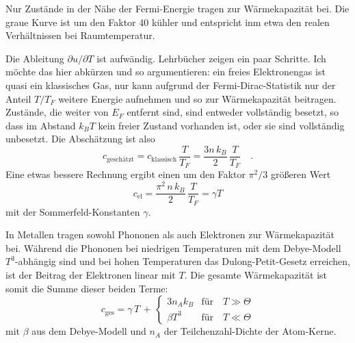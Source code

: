 \begin{marginfigure}
    \caption{Nur Zustände in der Nähe der Fermi-Energie tragen zur Wärmekapazität bei. Die graue Kurve ist um den Faktor 40 kühler und entspricht inm etwa den realen Verhältnissen bei Raumtemperatur.}
    \label{fig:2_fermi_dirac_T}
\end{marginfigure}


Die Ableitung $\partial u / \partial T$ ist aufwändig. Lehrbücher zeigen ein paar Schritte. Ich möchte das hier abkürzen und so argumentieren: ein freies Elektronengas ist quasi ein klassisches Gas, nur kann aufgrund der Fermi-Dirac-Statistik nur der Anteil $T/T_F$ weitere Energie aufnehmen und so zur Wärmekapazität beitragen. Zustände, die weiter von $E_F$ entfernt sind, sind entweder vollständig besetzt, so dass im Abstand $k_B T$ kein freier Zustand vorhanden ist, oder sie sind vollständig unbesetzt. Die Abschätzung ist also
\begin{equation}
    c_\text{geschätzt} = c_\text{klassisch}  \, \frac{T}{T_F} = \frac{3 n \, k_B}{2}  \, \frac{T}{T_F} \quad .
\end{equation}
Eine etwas bessere Rechnung ergibt einen um den Faktor $\pi^2/3$ größeren Wert
\begin{equation}
    c_\text{el} = \frac{\pi^2 \, n \, k_B}{2}  \, \frac{T}{T_F} = \gamma T \label{eq:2_WK_elek}
\end{equation}
mit der Sommerfeld-Konstanten $\gamma$.

In Metallen tragen sowohl Phononen als auch Elektronen zur Wärmekapazität bei. Während die Phononen bei niedrigen Temperaturen mit dem Debye-Modell $T^3$-abhängig sind und bei hohen Temperaturen das Dulong-Petit-Gesetz erreichen, ist der Beitrag der Elektronen linear mit $T$. Die gesamte Wärmekapazität ist somit die Summe dieser beiden Terme:
\begin{equation}
    c_\text{ges} = \gamma \, T \, + \, 
        \left\{ 
        \begin{matrix}
            3 n_A k_B & \text{für} \quad T \gg \Theta \\
            \beta T^3 & \text{für} \quad T \ll \Theta 
        \end{matrix}
        \right. \label{eq:2_WK_Metall_ges}
\end{equation}
mit $\beta$ aus dem Debye-Modell und $n_A$ der Teilchenzahl-Dichte der Atom-Kerne.



